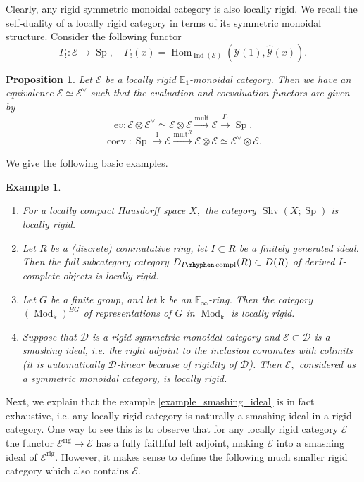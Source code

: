 \documentclass[11pt,leqno]{amsart}
\newtheorem{prop}[theo]{Proposition}
\newtheorem{example}[theo]{Example}
\numberwithin{equation}{section}
\def\Hom{\operatorname{Hom}}
\newcommand{\hy}{\mhyphen}
\newcommand{\xto}{\xrightarrow}
\newcommand{\rig}{\operatorname{rig}}
\newcommand{\bE}{{\mathbb E}}
\newcommand{\mk}{\mathrm k}
\newcommand{\ev}{\mathrm ev}
\newcommand{\cD}{{\mathcal D}}
\newcommand{\cE}{{\mathcal E}}
\newcommand{\cY}{{\mathcal Y}}
\newcommand{\Shv}{\operatorname{Shv}}
\newcommand{\Sp}{\operatorname{Sp}}
\newcommand{\Ind}{\operatorname{Ind}}
\newcommand{\coev}{\operatorname{coev}}
\newcommand{\compl}{\operatorname{compl}}
\newcommand{\Mod}{\operatorname{Mod}}
\newcommand{\mult}{\operatorname{mult}}
\begin{document}
Clearly, any rigid symmetric monoidal category is also locally rigid. We recall the self-duality of a locally rigid category in terms of its symmetric monoidal structure. Consider the following functor
\begin{equation*}
\Gamma_!:\cE\to\Sp,\quad \Gamma_!(x)=\Hom_{\Ind(\cE)}(\cY(1),\hat{\cY}(x)).
\end{equation*}

\begin{prop}\cite[Section C.3]{AGKRV20} \cite[Proposition 4.21]{Ram24b} Let $\cE$ be a locally rigid $\bE_1$-monoidal category. Then we have an equivalence $\cE\simeq \cE^{\vee}$ such that the evaluation and coevaluation functors are given by
\begin{equation*}
\ev:\cE\otimes\cE^{\vee}\simeq\cE\otimes\cE\xto{\mult}\cE\xto{\Gamma_!}\Sp.	
\end{equation*}
\begin{equation*}
\coev:\Sp\xto{1}\cE\xto{\mult^R}\cE\otimes\cE\simeq\cE^{\vee}\otimes\cE.
\end{equation*}
\end{prop}

We give the following basic examples.

\begin{example}
\begin{enumerate}[label=(\roman*),ref=(\roman*)]
\item For a locally compact Hausdorff space $X,$ the category $\Shv(X;\Sp)$ is locally rigid.
\item Let $R$ be a (discrete) commutative ring, let $I\subset R$ be a finitely generated ideal. Then the full subcategory category $D_{I\hy\compl}(R)\subset D(R)$ of derived $I$-complete objects is locally rigid.
\item Let $G$ be a finite group, and let $\mk$ be an $\bE_{\infty}$-ring. Then the category $(\Mod_{\mk})^{B G}$ of representations of $G$ in $\Mod_{\mk}$ is locally rigid.
\item Suppose that $\cD$ is a rigid symmetric monoidal category and $\cE\subset\cD$ is a smashing ideal, i.e. the right adjoint to the inclusion commutes with colimits (it is automatically $\cD$-linear because of rigidity of $\cD$). Then $\cE,$ considered as a symmetric monoidal category, is locally rigid. \label{example_smashing_ideal}
\end{enumerate}
\end{example}

Next, we explain that the example \ref{example_smashing_ideal} is in fact exhaustive, i.e. any locally rigid category is naturally a smashing ideal in a rigid category. One way to see this is to observe that for any locally rigid category $\cE$ the functor $\cE^{\rig}\to \cE$ has a fully faithful left adjoint, making $\cE$ into a smashing ideal of $\cE^{\rig}.$ However, it makes sense to define the following much smaller rigid category which also contains $\cE$.
\end{document}

